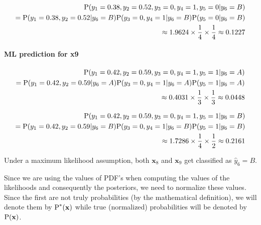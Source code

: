 \documentclass[12pt]{article}
\begin{document}
\begin{enumerate}[leftmargin=\labelsep]
\begin{enumerate}
            \begin{equation}
            \begin{split}
                \textrm{P}(y_1 = 0.38, y_2 = 0.52, y_3 = 0, y_4 = 1, y_5 = 0|y_6 = B) \\
                = \textrm{P}(y_1 = 0.38, y_2 = 0.52|y_6 = B)\textrm{P}(y_3 = 0, y_4 = 1|y_6 = B)\textrm{P}(y_5 = 0|y_6 = B) \\
                \approx 1.9624 \times \frac{1}{4} \times \frac{1}{4} \approx 0.1227
            \end{split}
            \end{equation}

            \paragraph{ML prediction for x9}

            \begin{equation}
            \begin{split}
                \textrm{P}(y_1 = 0.42, y_2 = 0.59, y_3 = 0, y_4 = 1, y_5 = 1|y_6 = A) \\
                = \textrm{P}(y_1 = 0.42, y_2 = 0.59|y_6 = A)\textrm{P}(y_3 = 0, y_4 = 1|y_6 = A)\textrm{P}(y_5 = 1|y_6 = A) \\
                \approx 0.4031 \times \frac{1}{3} \times \frac{1}{3} \approx 0.0448
            \end{split}
            \end{equation}

            \begin{equation}
            \begin{split}
                \textrm{P}(y_1 = 0.42, y_2 = 0.59, y_3 = 0, y_4 = 1, y_5 = 1|y_6 = B) \\
                = \textrm{P}(y_1 = 0.42, y_2 = 0.59|y_6 = B)\textrm{P}(y_3 = 0, y_4 = 1|y_6 = B)\textrm{P}(y_5 = 1|y_6 = B) \\
                \approx 1.7286 \times \frac{1}{4} \times \frac{1}{2} \approx 0.2161
            \end{split}
            \end{equation}

            Under a maximum likelihood assumption, both $\mathbf{x}_8$ and $\mathbf{x}_9$ get classified as $\hat{y}_6 = B$.

            Since we are using the values of PDF's when computing the values of the likelihoods and consequently the posteriors, we need to normalize these values. Since the first are not truly probabilities (by the mathematical definition), we will denote them by $\textrm{P}^*(\mathbf{x})$ while true (normalized) probabilities will be denoted by $\textrm{P}(\mathbf{x})$.


\end{enumerate}
\end{enumerate}
\end{document}
